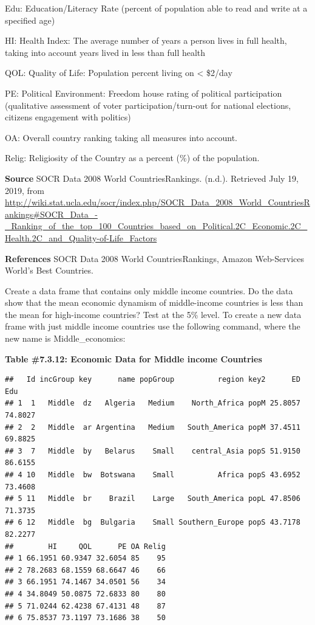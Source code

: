 \documentclass[
]{book}
\newenvironment{Shaded}{\begin{snugshade}}{\end{snugshade}}
\newcommand{\KeywordTok}[1]{\textcolor[rgb]{0.13,0.29,0.53}{\textbf{#1}}}
\newcommand{\NormalTok}[1]{#1}
\newcommand{\OperatorTok}[1]{\textcolor[rgb]{0.81,0.36,0.00}{\textbf{#1}}}
\newcommand{\StringTok}[1]{\textcolor[rgb]{0.31,0.60,0.02}{#1}}
\begin{document}
Edu: Education/Literacy Rate (percent of population able to read and write at a specified age)

HI: Health Index: The average number of years a person lives in full health, taking into account years lived in less than full health

QOL: Quality of Life: Population percent living on \textless{} \$2/day

PE: Political Environment: Freedom house rating of political participation (qualitative assessment of voter participation/turn-out for national elections, citizens engagement with politics)

OA: Overall country ranking taking all measures into account.

Relig: Religiosity of the Country as a percent (\%) of the population.

\textbf{Source}
SOCR Data 2008 World CountriesRankings. (n.d.). Retrieved July 19, 2019, from \url{http://wiki.stat.ucla.edu/socr/index.php/SOCR_Data_2008_World_CountriesRankings\#SOCR_Data_-_Ranking_of_the_top_100_Countries_based_on_Political.2C_Economic.2C_Health.2C_and_Quality-of-Life_Factors}

\textbf{References}
SOCR Data 2008 World CountriesRankings, Amazon Web-Services World's Best Countries.

Create a data frame that contains only middle income countries. Do the data show that the mean economic dynamism of middle-income countries is less than the mean for high-income countries? Test at the 5\% level. To create a new data frame with just middle income countries use the following command, where the new name is Middle\_economics:

\textbf{Table \#7.3.12: Economic Data for Middle income Countries}

\begin{Shaded}
\end{Shaded}

\begin{verbatim}
##   Id incGroup key      name popGroup          region key2      ED     Edu
## 1  1   Middle  dz   Algeria   Medium    North_Africa popM 25.8057 74.8027
## 2  2   Middle  ar Argentina   Medium   South_America popM 37.4511 69.8825
## 3  7   Middle  by   Belarus    Small    central_Asia popS 51.9150 86.6155
## 4 10   Middle  bw  Botswana    Small          Africa popS 43.6952 73.4608
## 5 11   Middle  br    Brazil    Large   South_America popL 47.8506 71.3735
## 6 12   Middle  bg  Bulgaria    Small Southern_Europe popS 43.7178 82.2277
##        HI     QOL      PE OA Relig
## 1 66.1951 60.9347 32.6054 85    95
## 2 78.2683 68.1559 68.6647 46    66
## 3 66.1951 74.1467 34.0501 56    34
## 4 34.8049 50.0875 72.6833 80    80
## 5 71.0244 62.4238 67.4131 48    87
## 6 75.8537 73.1197 73.1686 38    50
\end{verbatim}
\end{document}
